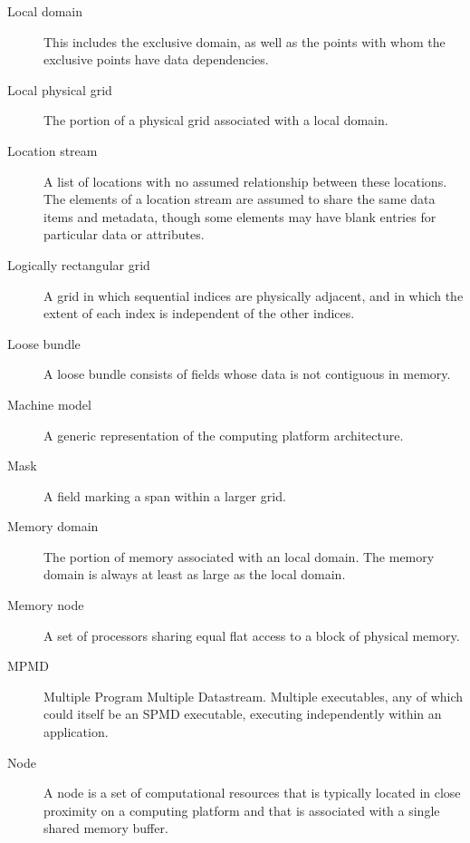 \begin{description}
\item[Local domain] \label{glos:LocalDomain} This includes the exclusive 
  domain, as well as the points with whom the exclusive points have data 
  dependencies.

\item[Local physical grid] \label{glos:LocPhysGrid} The portion of a 
  physical grid associated with a local domain.  

\item[Location stream] \label{glos:LocStream} A list of
  locations with no assumed relationship between these locations.  The
  elements of a location stream are assumed to share the same data
  items and metadata, though some elements may have blank entries for
  particular data or attributes.

\item[Logically rectangular grid] \label{glos:RecGrid} A grid in 
  which sequential indices are physically adjacent, and in which the 
  extent of each index is independent of the other indices.

\item[Loose bundle] \label{glos:LooseBundle} A loose bundle consists of 
  fields whose data is not contiguous in memory.

\item[Machine model] A generic representation of the computing 
  platform architecture.

\item[Mask] \label{glos:Mask} A field marking a span within a larger grid.

\item[Memory domain] \label{glos:MemDomain} The portion of memory 
  associated with an local domain.  The memory domain is always at least 
  as large as the local domain.

\item[Memory node] \label{glos:Mnode} A set of processors
  sharing equal flat access to a block of physical memory.

\item[MPMD] \label{glos:MPMD} Multiple Program Multiple Datastream.
  Multiple executables, any of which could itself be an SPMD
  executable, executing independently within an application.

\item[Node] \label{glos:Node} A node is a set of computational resources
  that is typically located in close proximity on a computing platform
  and that is associated with a single shared memory buffer.


\end{description}
